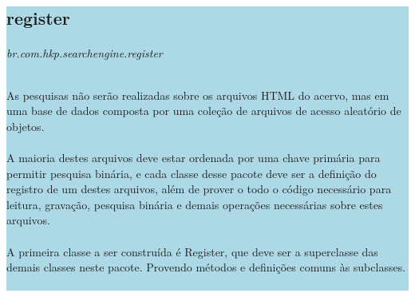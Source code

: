 \documentclass[a4paper,12pt,openany]{book}
\begin{document}
%
\colorbox{lightblue}{
	
\begin{minipage}{18cm}
	
\part*{register}

\paragraph{br.com.hkp.searchengine.register}

As pesquisas não serão realizadas sobre os arquivos HTML do acervo, mas em uma base de 
dados composta por uma coleção de arquivos de acesso aleatório de objetos.\\
\\
A maioria destes arquivos deve estar ordenada por uma chave primária para permitir 
pesquisa binária, e cada classe desse pacote deve ser a definição do registro de um destes arquivos, além de prover o todo o código necessário para leitura, gravação, pesquisa binária e demais operações necessárias sobre estes arquivos.\\
\\
A primeira classe a ser construída é Register, que deve ser a superclasse das demais classes neste pacote. Provendo métodos e definições comuns às subclasses.\\
\\



\end{minipage}

}%

\newpage

\end{document}

